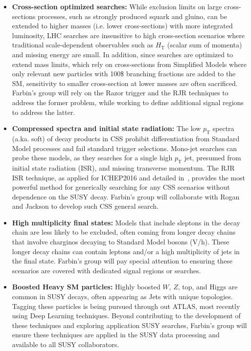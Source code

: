 \begin{itemize}
\item \textbf{Cross-section optimized searches:} While exclusion limits
  on large cross-sections processes, such as strongly produced squark
  and gluino, can be extended to higher masses (i.e. lower
  cross-sections) with more integrated luminosity, LHC searches are
  insensitive to high cross-section scenarios where traditional
  scale-dependent observables such as $H_\mathrm{T}$ (scalar sum of
  momenta) and missing energy are small. In addition, since searches
  are optimized to extend mass limits, which rely on cross-sections
  from Simplified Models where only relevant new particles with 100\$
  branching fractions are added to the SM, sensitivity to smaller
  cross-section at lower masses are often sacrificed. Farbin's group
  will rely on the Razor trigger and the RJR techniques to address the
  former problem, while working to define additional signal regions to
  address the latter.

\item \textbf{Compressed spectra and initial state radiation:} The low
  $p_\mathrm{T}$ spectra (a.ka. soft) of decay products in CSS
  prohibit differentiation from Standard Model processes and fail
  standard trigger selections.  Mono-jet searches can probe these
  models, as they searches for a single high $p_\mathrm{T}$ jet,
  presumed from initial state radiation (ISR), and missing transverse
  momentum. The RJR ISR technique, as applied for ICHEP2016 and
  detailed in~\cite{}, provides the most powerful method for
  generically searching for any CSS scenarios without dependence on
  the SUSY decay. Farbin's group will collaborate with Rogan and
  Jackson to develop such CSS general search. 

\item \textbf{High multiplicity final states:} Models that include
  sleptons in the decay chain are less likely to be excluded, often
  coming from longer decay chains that involve charginos decaying to
  Standard Model bosons (V/h). These longer decay chains can contain
  leptons and/or a high multiplicity of jets in the final
  state. Farbin's group will pay special attention to ensuring these
  scenarios are covered with dedicated signal regions or searches.

\item \textbf{Boosted Heavy SM particles:} Highly boosted $W$, $Z$,
  top, and Higgs are common in SUSY decays, often appearing as Jets
  with unique topologies. Tagging these particles is being pursued
  through out ATLAS, most recently using Deep Learning
  techniques. Beyond contributing to the development of these
  techniques and exploring application SUSY searches, Farbin's group
  will ensure these techniques are applied in the SUSY data processing
  and available to all SUSY collaborators. 
\end{itemize}


